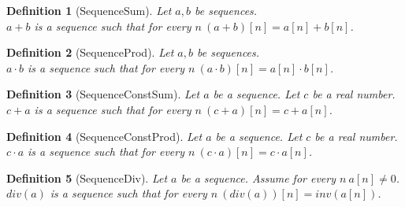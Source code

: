 \documentclass{article}
\newenvironment{forthel}{\begin{leftbar}}{\end{leftbar}}
\newtheorem{definition}{Definition}
\newcommand{\cdotone}{\cdot}
\newcommand{\cdottwo}{\cdot}
\newcommand{\plusone}{+}
\newcommand{\plustwo}{+}
\begin{document}
\begin{forthel}	
	\begin{definition}[SequenceSum]
	Let $a,b$ be sequences. \\$a \plusone b$ is a sequence such that for every $n \ (a \plusone b)[n] = a[n] + b[n]$.
	\end{definition}
	
	\begin{definition}[SequenceProd]
	Let $a,b$ be sequences. \\$a \cdotone b$ is a sequence such that for every $n \ (a \cdotone b)[n] = a[n] \cdot b[n]$.
	\end{definition}
	
	\begin{definition}[SequenceConstSum]
	Let $a$ be a sequence. Let $c$ be a real number. $c \plustwo a$ is a sequence such that for every $n \ (c \plustwo a)[n] = c + a[n]$.
	\end{definition}
	
	\begin{definition}[SequenceConstProd]
	Let $a$ be a sequence. Let $c$ be a real number. $c \cdottwo a$ is a sequence such that for every $n \ (c \cdottwo a)[n] = c \cdot a[n]$.
	\end{definition}

	\begin{definition}[SequenceDiv]
	Let $a$ be a sequence. Assume for every $n \ a[n] \neq 0$. $div(a)$ is a sequence such that for every $n \ (div(a))[n] = inv(a[n])$.
	\end{definition}
	

\end{forthel}
\end{document}
